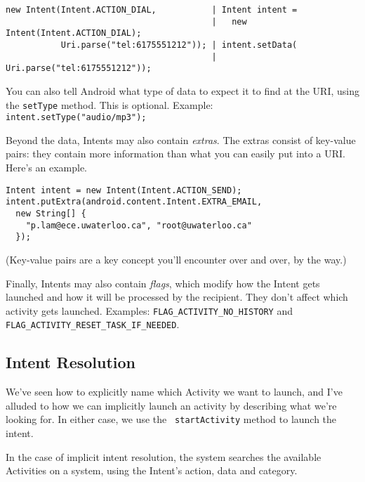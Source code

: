 {\scriptsize
\begin{verbatim}
new Intent(Intent.ACTION_DIAL,           | Intent intent = 
                                         |   new Intent(Intent.ACTION_DIAL);
           Uri.parse("tel:6175551212")); | intent.setData(
                                         |   Uri.parse("tel:6175551212"));
\end{verbatim}
}

You can also tell Android what type of data to expect it to find at
the URI, using the {\tt setType} method. This is optional. Example: {\tt
  intent.setType("audio/mp3");}


Beyond the data, Intents may also contain \emph{extras}. The extras
consist of key-value pairs: they contain more information than what you
can easily put into a URI. Here's an example.

{\small 
\begin{verbatim}
Intent intent = new Intent(Intent.ACTION_SEND);
intent.putExtra(android.content.Intent.EXTRA_EMAIL,
  new String[] {
    "p.lam@ece.uwaterloo.ca", "root@uwaterloo.ca"
  });
\end{verbatim}
}

(Key-value pairs are a key concept you'll encounter over and over, by
  the way.)

Finally, Intents may also contain \emph{flags}, which modify how the
Intent gets launched and how it will be processed by the recipient. 
They don't affect which activity gets launched. Examples: {\tt FLAG\_ACTIVITY\_NO\_HISTORY} and 
{\tt FLAG\_ACTIVITY\_RESET\_TASK\_IF\_NEEDED}.

\subsection*{Intent Resolution}
We've seen how to explicitly name which Activity we want to launch,
and I've alluded to how we can implicitly launch an activity by
describing what we're looking for. In either case, we use the {\tt
  startActivity} method to launch the intent.

In the case of implicit intent resolution, the system searches the
available Activities on a system, using the Intent's action, data
and category.


